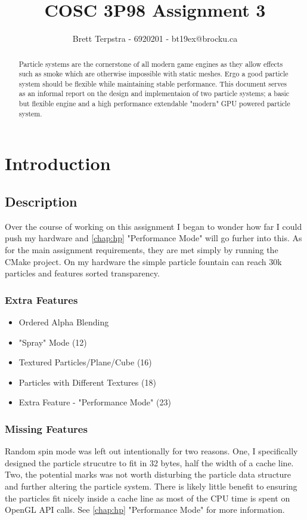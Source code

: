 \documentclass[]{report}
\title{COSC 3P98 Assignment 3}
\author{Brett Terpstra - 6920201 - bt19ex@brocku.ca}
\begin{document}
\maketitle

\begin{abstract}
Particle systems are the cornerstone of all modern game engines as they allow effects such as smoke which are otherwise impossible with static meshes. Ergo a good particle system should be flexible while maintaining stable performance. This document serves as an informal report on the design and implementaion of two particle systems; a basic but flexible engine and a high performance extendable "modern" GPU powered particle system.
\end{abstract}

\tableofcontents

\chapter{Introduction}
\section{Description}
Over the course of working on this assignment I began to wonder how far I could push my hardware and \autoref{chap:hp} "Performance Mode" will go furher into this. As for the main assignment requirements, they are met simply by running the CMake project. On my hardware the simple particle fountain can reach 30k particles and features sorted transparency.
\subsection{Extra Features}
\begin{itemize}
	\item Ordered Alpha Blending
	\item "Spray" Mode (12)
	\item Textured Particles/Plane/Cube (16)
	\item Particles with Different Textures (18)
	\item Extra Feature - "Performance Mode" (23)
\end{itemize}
\subsection{Missing Features}
Random spin mode was left out intentionally for two reasons. One, I specifically designed the particle strucutre to fit in 32 bytes, half the width of a cache line. Two, the potential marks was not worth disturbing the particle data structure and further altering the particle system. There is likely little benefit to ensuring the particles fit nicely inside a cache line as most of the CPU time is spent on OpenGL API calls. See \autoref{chap:hp} "Performance Mode" for more information.
\end{document}
